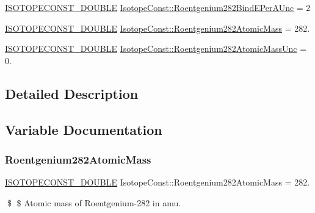 \begin{DoxyCompactItemize}
\item 
\mbox{\hyperlink{group___isotope_const-_macros_ga8f45a7272ce02c0b4c65c44636ed719a}{I\+S\+O\+T\+O\+P\+E\+C\+O\+N\+S\+T\+\_\+\+D\+O\+U\+B\+LE}} \mbox{\hyperlink{group___isotope_const-_roentgenium-_rg282_gaa4e91e2aeaeff7657f2d6d12e91871a8}{Isotope\+Const\+::\+Roentgenium282\+Bind\+E\+Per\+A\+Unc}} = 2
\item 
\mbox{\hyperlink{group___isotope_const-_macros_ga8f45a7272ce02c0b4c65c44636ed719a}{I\+S\+O\+T\+O\+P\+E\+C\+O\+N\+S\+T\+\_\+\+D\+O\+U\+B\+LE}} \mbox{\hyperlink{group___isotope_const-_roentgenium-_rg282_ga364e3f0d3add8c0f3dedadb6d2d40551}{Isotope\+Const\+::\+Roentgenium282\+Atomic\+Mass}} = 282.
\item 
\mbox{\hyperlink{group___isotope_const-_macros_ga8f45a7272ce02c0b4c65c44636ed719a}{I\+S\+O\+T\+O\+P\+E\+C\+O\+N\+S\+T\+\_\+\+D\+O\+U\+B\+LE}} \mbox{\hyperlink{group___isotope_const-_roentgenium-_rg282_ga18d6063c59a99b70415b9d0a1181319f}{Isotope\+Const\+::\+Roentgenium282\+Atomic\+Mass\+Unc}} = 0.
\end{DoxyCompactItemize}


\subsection{Detailed Description}


\subsection{Variable Documentation}
\mbox{\label{group___isotope_const-_roentgenium-_rg282_ga364e3f0d3add8c0f3dedadb6d2d40551}} 
\subsubsection{\texorpdfstring{Roentgenium282\+Atomic\+Mass}{Roentgenium282AtomicMass}}
{\footnotesize\ttfamily \mbox{\hyperlink{group___isotope_const-_macros_ga8f45a7272ce02c0b4c65c44636ed719a}{I\+S\+O\+T\+O\+P\+E\+C\+O\+N\+S\+T\+\_\+\+D\+O\+U\+B\+LE}} Isotope\+Const\+::\+Roentgenium282\+Atomic\+Mass = 282.}

\$ \$ Atomic mass of Roentgenium-\/282 in amu. \mbox{\label{group___isotope_const-_roentgenium-_rg282_ga18d6063c59a99b70415b9d0a1181319f}} 
